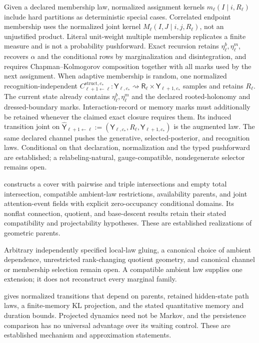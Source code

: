 \begin{description}
Given a declared membership law, normalized assignment kernels
\(m_\ell(I\mid i,R_\ell)\) include hard partitions as deterministic special
cases. Correlated endpoint membership uses the normalized joint kernel
\(M_\ell(I,J\mid i,j,R_\ell)\), not an unjustified product. Literal unit-weight
multiple membership replicates a finite measure and is not a probability
pushforward. Exact recursion retains \(\eta_\ell^b,\eta_\ell^m\), recovers
\(\alpha\) and the conditional rows by marginalization and disintegration, and
requires Chapman--Kolmogorov composition together with all marks used by the
next assignment. When adaptive membership is random, one normalized
recognition-independent
\(C^{\mathrm{struct},c_*}_{\ell+1\leftarrow\ell}:
\mathsf Y_{\ell,c_*}\rightsquigarrow
\mathsf R_\ell\times\mathsf Y_{\ell+1,c_*}\) samples and retains \(R_\ell\).
The current state already contains \(\eta_\ell^b,\eta_\ell^m\) and the declared
rooted-holonomy and dressed-boundary marks. Interaction-record or memory marks
must additionally be retained whenever the claimed exact closure requires
them. Its induced transition joint on
\(\widehat{\mathsf Y}_{\ell+1\leftarrow\ell}
:=(\mathsf Y_{\ell,c_*},R_\ell,\mathsf Y_{\ell+1,c_*})\) is the augmented law.
The same declared channel pushes the generative, selected-posterior, and
recognition laws. Conditional on that declaration, normalization and the typed
pushforward are established; a relabeling-natural, gauge-compatible,
nondegenerate selector remains open. 

\item[Neighborhood parents and descent (established/open split).]
 constructs a cover with pairwise and triple
intersections and empty total intersection, compatible ambient-law
restrictions, availability parents, and joint attention-event fields with
explicit zero-occupancy conditional domains. Its nonflat connection,
quotient, and base-descent results retain their stated compatibility and
projectability hypotheses. These are established realizations of geometric
parents. 

Arbitrary independently specified local-law gluing, a canonical choice of
ambient dependence, unrestricted rank-changing quotient geometry, and
canonical channel or membership selection remain open. A compatible ambient
law supplies one extension; it does not reconstruct every marginal family.

\item[Parent mechanisms, memory, and agency (established/open split).]
 gives normalized transitions that depend on parents,
retained hidden-state path laws, a finite-memory KL projection, and the
stated quantitative memory and duration bounds. Projected dynamics need not
be Markov, and the persistence comparison has no universal advantage over
its waiting control. These are established mechanism and approximation
statements. 


\end{description}
